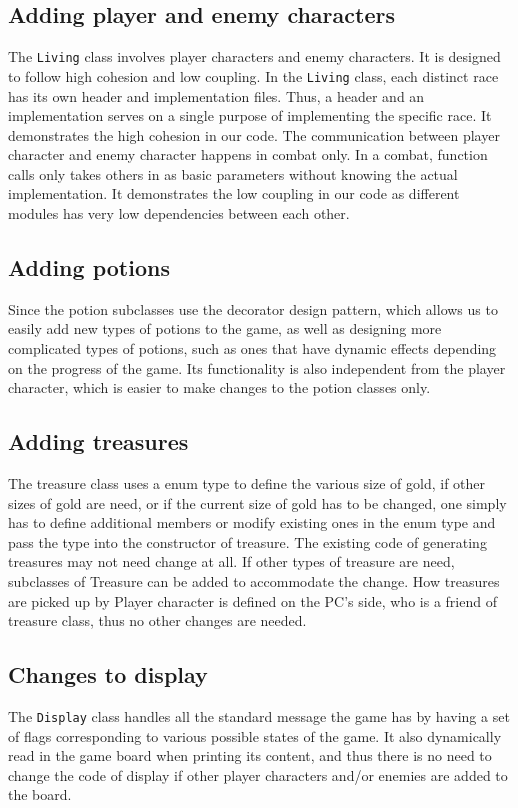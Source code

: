 \documentclass[11pt]{article}
\theoremstyle{plain} \newtheorem{theorem*}{Theorem}[subsection]
\begin{document}
\subsection{Adding player and enemy characters}
The \texttt{Living} class involves player characters and enemy characters. 
It is designed to follow high cohesion and low coupling. 
In the \texttt{Living} class, each distinct race has its own header and 
implementation files. Thus, a header and an
implementation serves on a single purpose of implementing the specific race. It
demonstrates the high cohesion in our code. The communication between player
character and enemy character happens in combat only. In a combat, function
calls only takes others in as basic parameters without knowing the actual
implementation. It demonstrates the low coupling in our code as different
modules has very low dependencies between each other. 

\subsection{Adding potions}
Since the potion subclasses use the decorator design pattern, which allows us
to easily add new types of potions to the game, as well as designing more
complicated types of potions, such as ones that have dynamic effects depending
on the progress of the game. Its functionality is also independent from the
player character, which is easier to make changes to the potion classes only. 

\subsection{Adding treasures}
The treasure class uses a enum type to define the various size of gold, if
other sizes of gold are need, or if the current size of gold has to be changed,
one simply has to define additional members or modify existing ones in the enum
type and pass the type into the constructor of treasure. The existing code of
generating treasures may not need change at all. If other types of treasure are
need, subclasses of Treasure can be added to accommodate the change. How
treasures are picked up by Player character is defined on the PC’s side, who is
a friend of treasure class, thus no other changes are needed. 

\subsection{Changes to display}
The \texttt{Display} class handles all the standard message the game has by 
having a set
of flags corresponding to various possible states of the game. It also
dynamically read in the game board when printing its content, and thus there is
no need to change the code of display if other player characters and/or enemies
are added to the board.  
\end{document}
